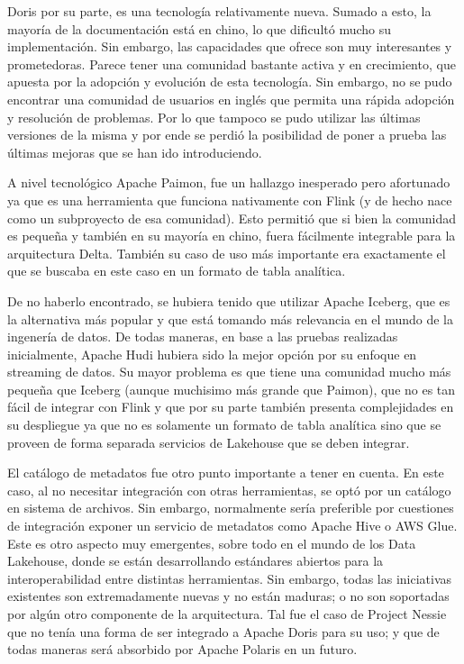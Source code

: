 \newpage

Doris por su parte, es una tecnología relativamente nueva. Sumado a esto, la mayoría de la documentación está en chino, lo que dificultó mucho su implementación.
Sin embargo, las capacidades que ofrece son muy interesantes y prometedoras. Parece tener una comunidad bastante activa y en crecimiento, 
que apuesta por la adopción y evolución de esta tecnología. 
Sin embargo, no se pudo encontrar una comunidad de usuarios en inglés que permita una rápida adopción y resolución de problemas. Por lo que tampoco se pudo utilizar 
las últimas versiones de la misma y por ende se perdió la posibilidad de poner a prueba las últimas mejoras que se han ido introduciendo.\newline

A nivel tecnológico Apache Paimon, fue un hallazgo inesperado pero afortunado ya que es una herramienta que funciona nativamente con Flink (y de hecho nace como un subproyecto de esa comunidad).
Esto permitió que si bien la comunidad es pequeña y también en su mayoría en chino, fuera fácilmente integrable para la arquitectura Delta. 
También su caso de uso más importante era exactamente el que se buscaba en este caso en un formato de tabla analítica. 

De no haberlo encontrado, se hubiera tenido que utilizar Apache Iceberg, que es la alternativa más popular y que está tomando más relevancia en el mundo de la ingenería de datos. 
De todas maneras, en base a las pruebas realizadas inicialmente, Apache Hudi hubiera sido la mejor opción por su enfoque en streaming de datos. 
Su mayor problema es que tiene una comunidad mucho más pequeña que Iceberg (aunque muchisimo más grande que Paimon), que no es tan fácil de integrar con Flink 
y que por su parte también presenta complejidades en su despliegue ya que no es solamente un formato de tabla analítica sino que se proveen de forma separada servicios de Lakehouse que se deben integrar. \newline

El catálogo de metadatos fue otro punto importante a tener en cuenta. En este caso, al no necesitar integración con otras herramientas,
se optó por un catálogo en sistema de archivos. Sin embargo, normalmente sería preferible por cuestiones de integración exponer un servicio de metadatos como Apache Hive o AWS Glue.
Este es otro aspecto muy emergentes, sobre todo en el mundo de los Data Lakehouse, donde se están desarrollando estándares abiertos para la interoperabilidad entre distintas herramientas.
Sin embargo, todas las iniciativas existentes son extremadamente nuevas y no están maduras; o no son soportadas por algún otro componente de la arquitectura. 
Tal fue el caso de Project Nessie que no tenía una forma de ser integrado a Apache Doris para su uso; y que de todas maneras será absorbido por Apache Polaris en un futuro.\newline

